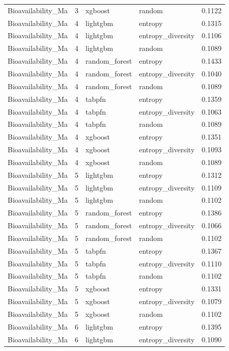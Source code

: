 \begin{tabular}{lrllr}
Bioavailability_Ma & 3 & xgboost & random & 0.1122 \\
Bioavailability_Ma & 4 & lightgbm & entropy & 0.1315 \\
Bioavailability_Ma & 4 & lightgbm & entropy_diversity & 0.1106 \\
Bioavailability_Ma & 4 & lightgbm & random & 0.1089 \\
Bioavailability_Ma & 4 & random_forest & entropy & 0.1433 \\
Bioavailability_Ma & 4 & random_forest & entropy_diversity & 0.1040 \\
Bioavailability_Ma & 4 & random_forest & random & 0.1089 \\
Bioavailability_Ma & 4 & tabpfn & entropy & 0.1359 \\
Bioavailability_Ma & 4 & tabpfn & entropy_diversity & 0.1063 \\
Bioavailability_Ma & 4 & tabpfn & random & 0.1089 \\
Bioavailability_Ma & 4 & xgboost & entropy & 0.1351 \\
Bioavailability_Ma & 4 & xgboost & entropy_diversity & 0.1093 \\
Bioavailability_Ma & 4 & xgboost & random & 0.1089 \\
Bioavailability_Ma & 5 & lightgbm & entropy & 0.1312 \\
Bioavailability_Ma & 5 & lightgbm & entropy_diversity & 0.1109 \\
Bioavailability_Ma & 5 & lightgbm & random & 0.1102 \\
Bioavailability_Ma & 5 & random_forest & entropy & 0.1386 \\
Bioavailability_Ma & 5 & random_forest & entropy_diversity & 0.1066 \\
Bioavailability_Ma & 5 & random_forest & random & 0.1102 \\
Bioavailability_Ma & 5 & tabpfn & entropy & 0.1367 \\
Bioavailability_Ma & 5 & tabpfn & entropy_diversity & 0.1110 \\
Bioavailability_Ma & 5 & tabpfn & random & 0.1102 \\
Bioavailability_Ma & 5 & xgboost & entropy & 0.1331 \\
Bioavailability_Ma & 5 & xgboost & entropy_diversity & 0.1079 \\
Bioavailability_Ma & 5 & xgboost & random & 0.1102 \\
Bioavailability_Ma & 6 & lightgbm & entropy & 0.1395 \\
Bioavailability_Ma & 6 & lightgbm & entropy_diversity & 0.1090 \\

\end{tabular}
